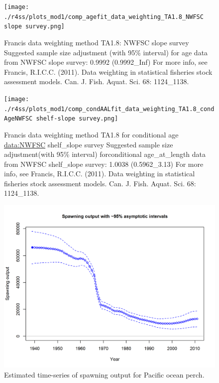 \documentclass[12pt,]{article}
\begin{document}
\begin{figure}
\centering
\texttt{[image: ./r4ss/plots\_mod1/comp\_agefit\_data\_weighting\_TA1.8\_NWFSC slope survey.png]}
\caption{Francis data weighting method TA1.8: NWFSC slope survey
Suggested sample size adjustment (with 95\% interval) for age data from
NWFSC slope survey: 0.9992 (0.9992\_Inf) For more info, see Francis,
R.I.C.C. (2011). Data weighting in statistical fisheries stock
assessment models. Can. J. Fish. Aquat. Sci. 68: 1124\_1138.
\label{fig:weighting_nwfscslope}}
\end{figure}

\begin{figure}
\centering
\texttt{[image: ./r4ss/plots\_mod1/comp\_condAALfit\_data\_weighting\_TA1.8\_condAgeNWFSC shelf-slope survey.png]}
\caption{Francis data weighting method TA1.8 for conditional age
\url{data:NWFSC} shelf\_slope survey Suggested sample size
adjustment(with 95\% interval) forconditional age\_at\_length data from
NWFSC shelf\_slope survey: 1.0038 (0.5962\_3.13) For more info, see
Francis, R.I.C.C. (2011). Data weighting in statistical fisheries stock
assessment models. Can. J. Fish. Aquat. Sci. 68: 1124\_1138.
\label{fig:weighting_nwfsccombo}}
\end{figure}

\FloatBarrier

\begin{figure}
\centering
\includegraphics{r4ss/plots_mod1/ts7_Spawning_output_with_95_asymptotic_intervals_intervals.png}
\caption{Estimated time-series of spawning output for Pacific ocean
perch. \label{fig:ssb}}
\end{figure}
\end{document}
